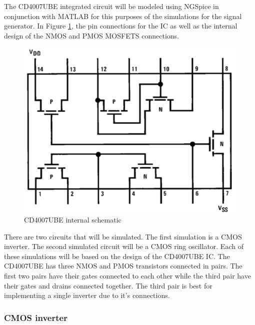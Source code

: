 



The CD4007UBE integrated circuit will be modeled using NGSpice in conjunction with MATLAB for this purposes of the simulations for the signal generator. In Figure \ref{fig:cd4007_inside}, the pin connections for the IC as well as the internal design of the NMOS and PMOS MOSFETS connections. 

\begin{figure}[H]
    \centering
        \centering
        \includegraphics[scale = .7]{CircuitDevelopment/cd4007SIM/cd4007_Inside.jpg}
        \caption{CD4007UBE internal schematic}
        \label{fig:cd4007_inside}
\end{figure} 




\noindent There are two circuits that will be simulated. The first simulation is a CMOS inverter. The second simulated circuit will be a CMOS ring oscillator. Each of these simulations will be based on the design of the CD4007UBE IC. The CD4007UBE has three NMOS and PMOS transistors connected in pairs. The first two pairs have their gates connected to each other while the third pair have their gates and drains connected together. The third pair is best for implementing a single inverter due to it's connections.  


\subsubsection{CMOS inverter}

